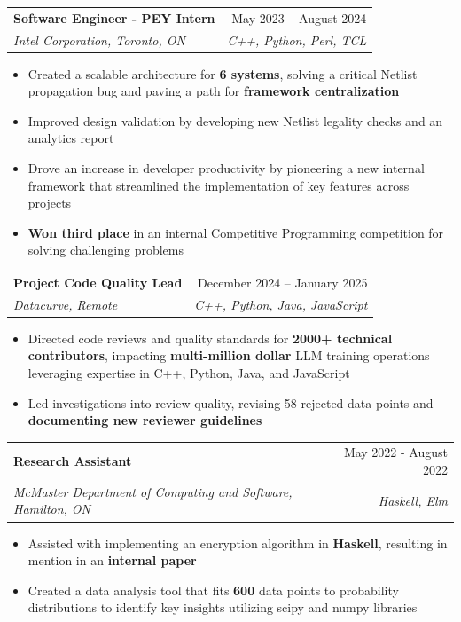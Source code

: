 \documentclass[letterpaper,11pt]{article}
\makeatletter
\newcommand{\resumeItem}[1]{
  \item\small{
    {#1 \vspace{-2pt}}
  }
}
\newcommand{\resumeSubheading}[4]{
  \vspace{-2pt}\item
    \begin{tabular*}{0.97\textwidth}[t]{l@{\extracolsep{\fill}}r}
      \textbf{#1} & #2 \\
      \textit{\small#3} & \textit{\small #4} \\
    \end{tabular*}\vspace{-7pt}
}
\newcommand{\resumeItemListStart}{\begin{itemize}}
\newcommand{\resumeItemListEnd}{\end{itemize}\vspace{-5pt}}
\makeatother
\begin{document}
\resumeSubheading
{Software Engineer - PEY Intern}{May 2023 -- August 2024}
{Intel Corporation, Toronto, ON}{C++, Python, Perl, TCL}
\resumeItemListStart
\resumeItem{Created a scalable architecture for \textbf{6 systems}, solving a critical Netlist propagation bug and paving a path for \textbf{framework centralization}}
\resumeItem{Improved design validation by developing new Netlist legality checks and an analytics report}
\resumeItem{Drove an increase in developer productivity by pioneering a new internal framework that streamlined the implementation of key features across projects}
\resumeItem{\textbf{Won third place} in an internal Competitive Programming competition for solving challenging problems}
\resumeItemListEnd

\resumeSubheading
{Project Code Quality Lead}{December 2024 -- January 2025}
{Datacurve, Remote}{C++, Python, Java, JavaScript}
\resumeItemListStart
\resumeItem{Directed code reviews and quality standards for \textbf{2000+ technical contributors}, impacting \textbf{multi-million dollar} LLM training operations leveraging expertise in C++, Python, Java, and JavaScript}
\resumeItem{Led investigations into review quality, revising 58 rejected data points and \textbf{documenting new reviewer guidelines}}
\resumeItemListEnd


\resumeSubheading
{Research Assistant}{May 2022 - August 2022}
{McMaster Department of Computing and Software, Hamilton, ON}{Haskell, Elm}
\resumeItemListStart
\resumeItem{Assisted with implementing an encryption algorithm in \textbf{Haskell}, resulting in mention in an \textbf{internal paper}}
\resumeItem{Created a data analysis tool that fits \textbf{600} data points to probability distributions to identify key insights utilizing scipy and numpy libraries}
\resumeItemListEnd
\end{document}
